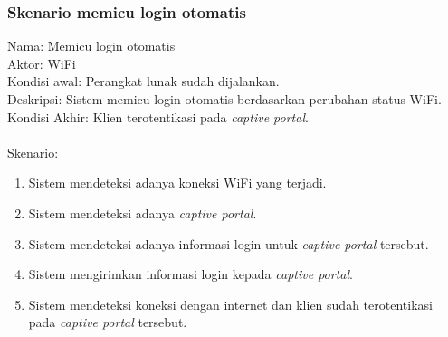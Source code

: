 \subsubsection{Skenario memicu login otomatis}
Nama: Memicu login otomatis\\
Aktor: WiFi\\
Kondisi awal: Perangkat lunak sudah dijalankan.\\
Deskripsi: Sistem memicu login otomatis berdasarkan perubahan status WiFi.\\
Kondisi Akhir: Klien terotentikasi pada \textit{captive portal}.\\\\
Skenario:
\begin{enumerate}
    \item{Sistem mendeteksi adanya koneksi WiFi yang terjadi.}
    \item{Sistem mendeteksi adanya \textit{captive portal}.}
    \item{Sistem mendeteksi adanya informasi login untuk \textit{captive portal} tersebut.}
    \item{Sistem mengirimkan informasi login kepada \textit{captive portal}.}
    \item{Sistem mendeteksi koneksi dengan internet dan klien sudah terotentikasi pada \textit{captive portal} tersebut.}
\end{enumerate}